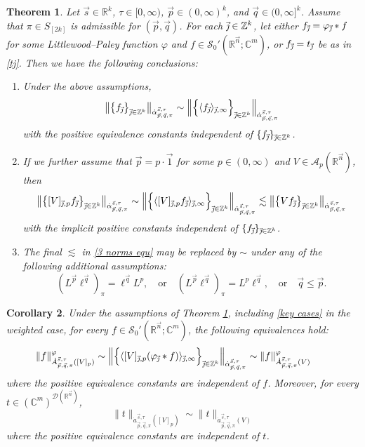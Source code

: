 \documentclass[11pt, reqno]{amsart}
\newtheorem{theorem}{Theorem}[section]
\newtheorem{corollary}[theorem]{Corollary}
\theoremstyle{definition}
\theoremstyle{remark}
\numberwithin{equation}{section}
\newcommand{\A}{\mathscr A}
\newcommand{\C}{\mathbb C}
\newcommand{\D}{\mathscr D}
\newcommand{\R}{\mathbb R}
\newcommand{\Sc}{\mathscr S}
\newcommand{\Z}{\mathbb Z}
\newcommand{\vone}{\vec 1}
\newcommand{\vj}{\vec{\textit{\j}}}
\newcommand{\vn}{\vec n}
\newcommand{\vp}{\vec p}
\newcommand{\vq}{\vec q}
\newcommand{\vs}{\vec s}
\newcommand{\Atau}{\dot A^{\vs,\tau}_{\vp,\vq,\pi}}
\newcommand{\atau}{\dot a^{\vs,\tau}_{\vp,\vq,\pi}}
\newcommand{\aatau}{\dot{\alpha}^{\vs,\tau}_{\vp,\vq,\pi}}
\newcommand{\Ave}[3]{\langle#1\rangle_{#2,#3}}
\newcommand{\Red}[3]{[#1]_{#2,#3}}
\newcommand{\Norm}[2]{\|#1\|_{#2}}
\newcommand{\bNorm}[2]{\big\|#1\big\|_{#2}}
\newcommand{\BNorm}[2]{\Big\|#1\Big\|_{#2}}
\begin{document}
\begin{theorem}\label{3 norms thm}
Let $\vs\in\R^k$, $\tau\in[0,\infty)$, $\vp\in(0,\infty)^k$, and $\vq\in(0,\infty]^k$.
Assume that $\pi\in S_{[2k]}$ is admissible for $(\vp,\vq)$.
For each $\vj\in\Z^k$, let either $f_{\vj}=\varphi_{\vj}*f$ for some Littlewood--Paley function $\varphi$ and $f\in\Sc_0'(\R^{\vn};\mathbb C^m)$, or $f_{\vj}=t_{\vj}$ be as in \eqref{tj}.
Then we have the following conclusions:
\begin{enumerate}[\rm(i)]
\item\label{it:f-avef}
Under the above assumptions,
\begin{equation*}
\bNorm{\big\{f_{\vj}\big\}_{\vj\in\Z^k}}{\aatau}
\sim\BNorm{\Big\{\Ave{f_{\vj}}{\vj}{\infty}\Big\}_{\vj\in\Z^k}}{\aatau}
\end{equation*}
with the positive equivalence constants independent of
$\{f_{\vj}\}_{\vj\in\Z^k}$.

\item\label{it:[V]<V}
If we further assume that $\vp =p\cdot\vone$ for some $p\in(0,\infty)$ and $V\in\A_p(\R^{\vn})$, then
\begin{equation}\label{3 norms equ}
\bNorm{\big\{\Red{V}{\vj}{p}f_{\vj}\big\}_{\vj\in\Z^k}}{\aatau}
\sim\BNorm{\Big\{\Ave{\Red{V}{\vj}{p}f_{\vj}}{\vj}{\infty}\Big\}_{\vj\in\Z^k}}{\aatau}
\lesssim\bNorm{\big\{ V f_{\vj} \big\}_{\vj\in\Z^k} }{\aatau}
\end{equation}
with the implicit positive constants independent of
$\{f_{\vj}\}_{\vj\in\Z^k}$.

\item\label{it:[V]=V}
The final $\lesssim$ in \eqref{3 norms equ} may be replaced by $\sim$ under any of the following additional assumptions:
\begin{equation}\label{key cases}
(L^{\vp}\ell^{\vq})_\pi=\ell^{\vq}L^p,\quad\text{or}\quad
(L^{\vp}\ell^{\vq})_\pi=L^p\ell^{\vq},\quad\text{or}\quad
\vq\leq\vp.
\end{equation}
\end{enumerate}
\end{theorem}

\begin{corollary}\label{3 norms cor}
Under the assumptions of Theorem \ref{3 norms thm},
including \eqref{key cases} in the weighted case,
for every $f\in\Sc_0'(\R^{\vn};\C^m)$,
the following equivalences hold:
\begin{equation}\label{3 norms A}
\Norm{f}{\Atau([V]_p)}^\varphi\sim
\BNorm{\Big\{\Ave{\Red{V}{\vj}{p}(\varphi_{\vj}*f)}{\vj}{\infty}\Big\}_{\vj\in\Z^k}}{\aatau}\sim
\Norm{f}{\Atau(V)}^\varphi\qquad
\end{equation}
where the positive equivalence constants are independent of $f$.
Moreover, for every $t\in(\C^m)^{\D(\R^{\vn})}$,
\begin{equation}\label{2 norms a}
\Norm{t}{\atau([V]_p)}\sim
\Norm{t}{\atau(V)}
\end{equation}
where the positive equivalence constants are independent of $t$.
\end{corollary}
\end{document}
